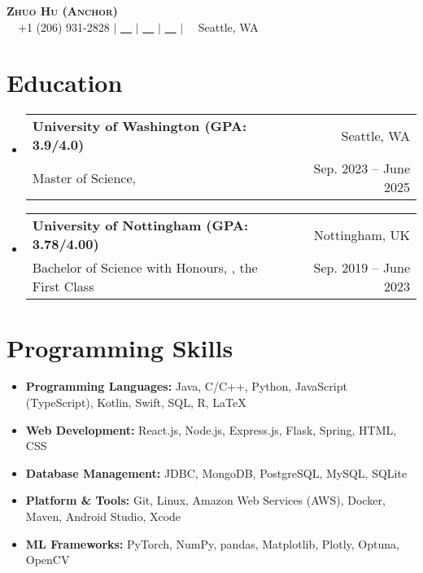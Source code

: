 \documentclass[letterpaper,10pt]{article}
\makeatletter
\newcommand{\link}[1]{\color{myBlue}{#1}}
\newcommand{\resumeSubheading}[4]{
  \vspace{-2pt}\item
    \begin{tabular*}{0.97\textwidth}[t]{l@{\extracolsep{\fill}}r}
      \textbf{#1} & #2 \\
      \small#3 & \small #4 \\
    \end{tabular*}\vspace{-7pt}
}
\newcommand{\resumeSubHeadingListStart}{\begin{itemize}[leftmargin=0.15in, label={}]}
\newcommand{\resumeSubHeadingListEnd}{\end{itemize}}
\makeatother
\begin{document}
\begin{center}
  \textbf{\Huge \scshape Zhuo Hu (Anchor)} \\ \vspace{1pt}
  \small \faMobile \ \ +1 (206) 931-2828 $|$ \href{mailto:uwzhuohu@uw.edu}{\faEnvelope \ \ \link{uwzhuohu@uw.edu}} $|$
  \href{https://linkedin.com/in/zhuo-hu}{\faLinkedin \ \ \link{LinkedIn}} $|$
  \href{https://github.com/Anchor-ZhuoHU}{\faGithub \ \ \link{GitHub}} $|$
  \faBuilding \ \ Seattle, WA
\end{center}
\section{Education}
\resumeSubHeadingListStart
\resumeSubheading
{University of Washington (GPA: 3.9/4.0)}{Seattle, WA}
{Master of Science, \href{https://www.ece.uw.edu/}{\link{Electrical and Computer Engineering}}}{Sep. 2023 -- June 2025}
\resumeSubheading
{University of Nottingham (GPA: 3.78/4.00)}{Nottingham, UK}
{Bachelor of Science with Honours, \href{https://www.nottingham.ac.uk/mathematics/}{\link{Mathematics with Applied Mathematics}}, the First Class}{Sep. 2019 -- June 2023}
\resumeSubHeadingListEnd
\section{Programming Skills}
\resumeSubHeadingListStart
\setlength\itemsep{0em}
\item \textbf{Programming Languages:} Java, C/C++, Python, JavaScript (TypeScript), Kotlin, Swift, SQL, R, \LaTeX
\item \textbf{Web Development:} React.js, Node.js, Express.js, Flask, Spring, HTML, CSS
\item \textbf{Database Management:} JDBC, MongoDB, PostgreSQL, MySQL, SQLite
\item \textbf{Platform \& Tools:} Git, Linux, Amazon Web Services (AWS), Docker, Maven, Android Studio, Xcode
\item \textbf{ML Frameworks:} PyTorch, NumPy, pandas, Matplotlib, Plotly, Optuna, OpenCV
\vspace{-8pt}
\resumeSubHeadingListEnd
\end{document}
